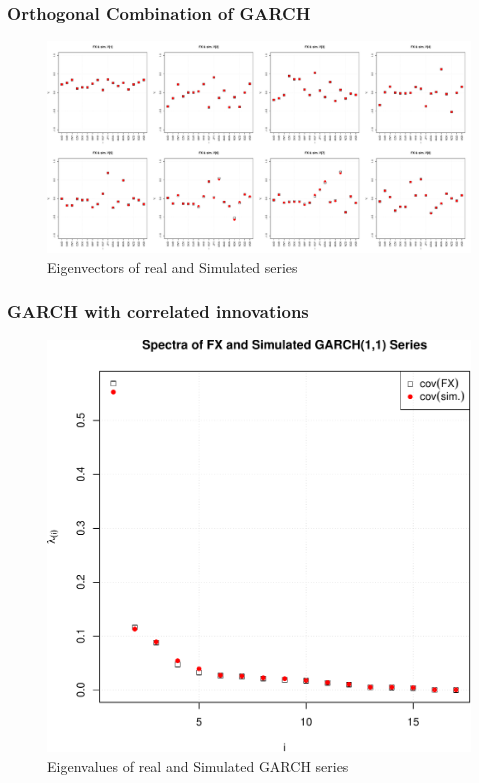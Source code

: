 \documentclass{beamer}
\begin{document}
\begin{frame}
  \frametitle{Orthogonal Combination of GARCH}
  \begin{figure}[htb!]
    \centering
    \includegraphics[scale=0.2]{FX_OGARCH_eigenvectors.pdf}
    \caption{\scriptsize Eigenvectors of real and Simulated series}
  \end{figure}
\end{frame}

\begin{frame}
  \frametitle{GARCH with correlated innovations}
  \begin{figure}[htb!]
    \centering
    \includegraphics[scale=0.35]{FX_eigenvalues.pdf}
    \caption{\scriptsize Eigenvalues of real and Simulated GARCH series}
  \end{figure}
\end{frame}
\end{document}
